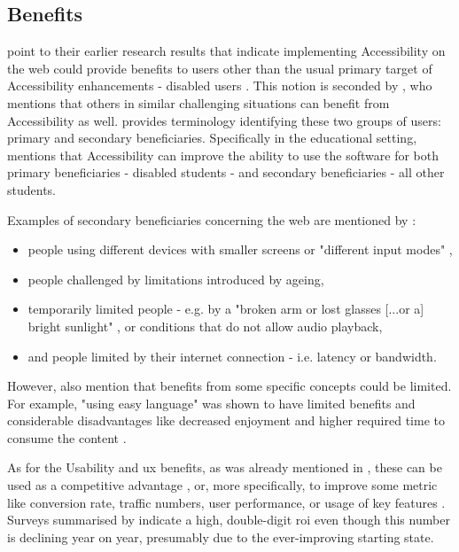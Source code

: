 \subsection{Benefits}
\label{Literature-HSIE-Benefits}

\textcite{Juergen_et_all_2020} point to their earlier research results that indicate implementing Accessibility on the web could provide benefits to users other than the usual primary target of Accessibility enhancements - disabled users \parencite{Schmutz_Sonderegger_Sauer_2016, Schmutz_Sonderegger_Sauer_2017, Schmutz_Sonderegger_Sauer_2018}.
This notion is seconded by \textcite{Vanderheiden_2000}, who mentions that others in similar challenging situations can benefit from Accessibility as well.
\textcite{Edyburn_2010} provides terminology identifying these two groups of users: primary and secondary beneficiaries. Specifically in the educational setting, \textcite{Edyburn_2021} mentions that Accessibility can improve the ability to use the software for both primary beneficiaries - disabled students - and secondary beneficiaries - all other students.

Examples of secondary beneficiaries concerning the web are mentioned by \textcite{WAI_Intro}:

\begin{itemize}
    \item people using different devices with smaller screens or "different input modes" \parencite{WAI_Intro},
    \item people challenged by limitations introduced by ageing,
    \item temporarily limited people - e.g. by a "broken arm or lost glasses [...or a] bright sunlight" \parencite{WAI_Intro}, or conditions that do not allow audio playback,
    \item and people limited by their internet connection - i.e. latency or bandwidth.
\end{itemize}

However, \textcite{Juergen_et_all_2020} also mention that benefits from some specific concepts could be limited. For example, "using easy language" \parencite[p. 1210]{Juergen_et_all_2020} was shown to have limited benefits and considerable disadvantages like decreased enjoyment and higher required time to consume the content \parencite{Schmutz_Sonderegger_Sauer_2019}.

As for the Usability and \gls{ux} benefits, as was already mentioned in , these can be used as a competitive advantage \parencite{Wegge_Zimmermann_2007}, or, more specifically, to improve some metric like conversion rate, traffic numbers, user performance, or usage of key features \parencite{Nielsen_2008}.
Surveys summarised by \textcite{Nielsen_2008} indicate a high, double-digit \gls{roi} even though this number is declining year on year, presumably due to the ever-improving starting state.

